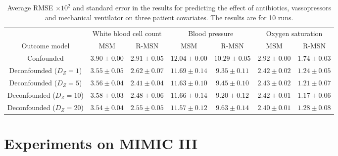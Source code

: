 \documentclass{article}
\begin{document}
		\begin{table}[ht]
		\caption{Average  RMSE $\times 10^2$  and standard error in the results for predicting the effect of antibiotics, vassopressors and mechanical ventilator on three patient covariates. The results are for 10 runs.}
		\label{tab:mimic}
		\begin{center}
			\begin{small}
				\begin{tabular}{c|cc|cc|cc}
					\toprule
					& \multicolumn{2}{c|}{White blood cell count} & \multicolumn{2}{c|}{Blood pressure} & \multicolumn{2}{c}{Oxygen saturation} \\
					Outcome model  & MSM & R-MSN & MSM & R-MSN & MSM & R-MSN  \\
					\hline
					Confounded  & $3.90 \pm 0.00$  &  $2.91 \pm 0.05$ & $12.04 \pm 0.00$&  $10.29 \pm 0.05$ & $2.92 \pm 0.00$  & $1.74 \pm 0.03$ \\
					\hline
					Deconfounded ($D_Z = 1$) & $3.55 \pm 0.05$  & $2.62 \pm 0.07$ & $11.69 \pm 0.14$  &  $9.35 \pm 0.11$ &  $2.42 \pm 0.02$  &  $1.24 \pm 0.05$ \\
					Deconfounded ($D_Z = 5$)  &  $3.56 \pm 0.04$& $2.41 \pm 0.04$ & $11.63 \pm 0.10$ &  $9.45 \pm 0.10$  &$2.43 \pm 0.02$  &  $1.21 \pm 0.07$  \\
					Deconfounded ($D_Z = 10$)  & $3.58 \pm 0.03$  & $2.48 \pm 0.06$ & $11.66 \pm 0.14$  &  $9.20 \pm 0.12$ &  $2.42 \pm 0.01$ & $1.17 \pm 0.06$  \\
					Deconfounded ($D_Z = 20$)  & $3.54 \pm 0.04$ & $2.55 \pm 0.05$ & $11.57 \pm 0.12$  &  $9.63 \pm 0.14$ & $2.40\pm 0.01$ & $1.28 \pm 0.08$\\
					\bottomrule
				\end{tabular}
			\end{small}
		\end{center}
		\vspace{-0.2cm}
	\end{table}
	
	\section{Experiments on MIMIC III} \label{sec:experiments_mimic}
	
\end{document}
